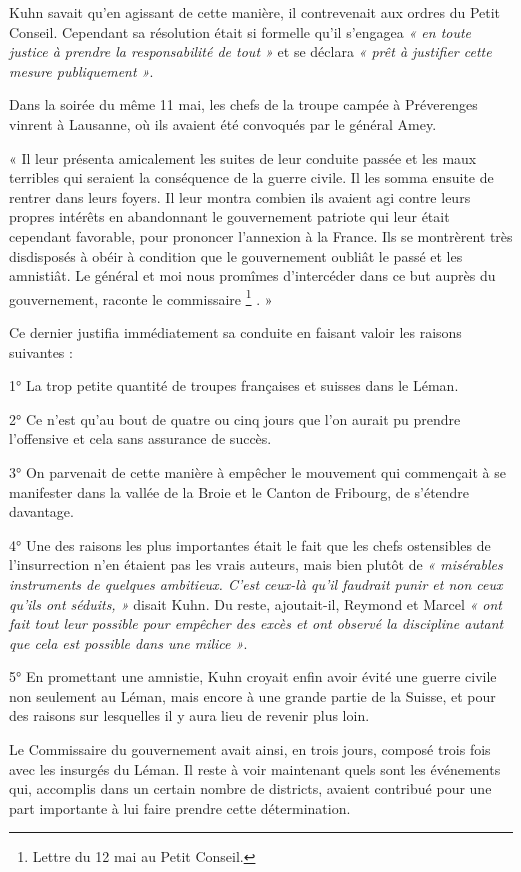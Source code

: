 \documentclass[french,twoside]{book} %
\newenvironment{quoteblock}%
  {\begin{quoting}}
  {\end{quoting}}
\newenvironment{quotebar}{%
    \def\FrameCommand{{\color{rubric!10!}\vrule width 0.5em} \hspace{0.9em}}%
    \def\OuterFrameSep{\itemsep} %
    \MakeFramed {\advance\hsize-\width \FrameRestore}
  }%
  {%
    \endMakeFramed
  }
\renewenvironment{quoteblock}%
  {%
    \savenotes
    \setstretch{0.9}
    \begin{quotebar}
  }
  {%
    \end{quotebar}
    \spewnotes
  }
\begin{document}
\noindent Kuhn savait qu’en agissant de cette manière, il contrevenait aux ordres du Petit Conseil. Cependant sa résolution était si formelle qu’il s’engagea \emph{« en toute justice à prendre la responsabilité de tout »} et se déclara \emph{« prêt à justifier cette mesure publiquement »}.\par
Dans la soirée du même 11 mai, les chefs de la troupe campée à Préverenges vinrent à Lausanne, où ils avaient été convoqués par le général Amey.\par

\begin{quoteblock}
 \noindent « Il leur présenta amicalement les suites de leur conduite passée et les maux terribles qui seraient la conséquence de la guerre civile. Il les somma ensuite de rentrer dans leurs foyers. Il leur montra combien ils avaient agi contre leurs propres intérêts en abandonnant le gouvernement patriote qui leur était cependant favorable, pour prononcer l’annexion à la France. Ils se montrèrent très disdisposés à obéir à condition que le gouvernement oubliât le passé et les amnistiât. Le général et moi nous promîmes d’intercéder dans ce but auprès du gouvernement, raconte le commissaire \footnote{Lettre du 12 mai au Petit Conseil.} . »
 \end{quoteblock}

\noindent Ce dernier justifia immédiatement sa conduite en faisant valoir les raisons suivantes :\par
1° La trop petite quantité de troupes françaises et suisses dans le Léman.\par
2° Ce n’est qu’au bout de quatre ou cinq jours que l’on aurait pu prendre l’offensive et cela sans assurance de succès.\par
3° On parvenait de cette manière à empêcher le mouvement qui commençait à se manifester dans la vallée de la Broie et le Canton de Fribourg, de s’étendre davantage.\par
4° Une des raisons les plus importantes était le fait que les chefs ostensibles de l’insurrection n’en étaient pas les vrais auteurs, mais bien plutôt de \emph{« misérables instruments de quelques ambitieux. C’est ceux-là qu’il faudrait punir et non ceux qu’ils ont séduits, »} disait Kuhn. Du reste, ajoutait-il, Reymond et Marcel \emph{« ont fait tout leur possible pour empêcher des excès et ont observé la discipline autant que cela est possible dans une milice »}.\par
5° En promettant une amnistie, Kuhn croyait enfin avoir évité une guerre civile non seulement au Léman, mais encore à une grande partie de la Suisse, et pour des raisons sur lesquelles il y aura lieu de revenir plus loin.\par
Le Commissaire du gouvernement avait ainsi, en trois jours, composé trois fois avec les insurgés du Léman. Il reste à voir maintenant quels sont les événements qui, accomplis dans un certain nombre de districts, avaient contribué pour une part importante à lui faire prendre cette détermination.
\end{document}
